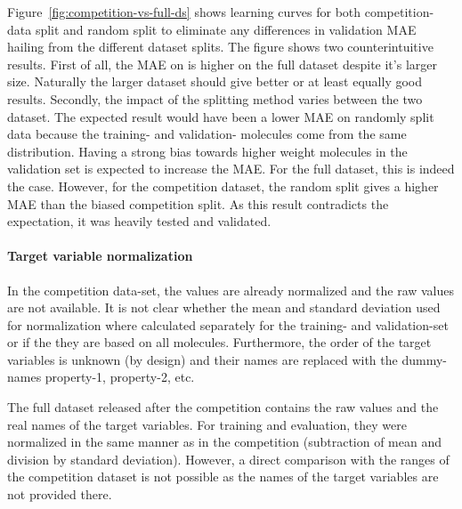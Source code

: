 Figure~\ref{fig:competition-vs-full-ds} shows learning curves for both competition-data split and random split to eliminate any differences in validation MAE hailing from the different dataset splits.
The figure shows two counterintuitive results. First of all, the MAE on is higher on the full dataset despite it's larger size. Naturally the larger dataset should give better or at least equally good results. Secondly, the impact of the splitting method varies between the two dataset. The expected result would have been a lower MAE on randomly split data because the training- and validation- molecules come from the same distribution. Having a strong bias towards higher weight molecules in the validation set is expected to increase the MAE. For the full dataset, this is indeed the case. However, for the competition dataset, the random split gives a higher MAE than the biased competition split. As this result contradicts the expectation, it was heavily tested and validated.



\paragraph{Target variable normalization}

In the competition data-set, the values are already normalized and the raw values are not available. It is not clear whether the mean and standard deviation used for normalization where calculated separately for the training- and validation-set or if the they are based on all molecules. Furthermore, the order of the target variables is unknown (by design) and their names are replaced with the dummy-names property-1, property-2, etc.

The full dataset released after the competition contains the raw values and the real names of the target variables. For training and evaluation, they were normalized in the same manner as in the competition (subtraction of mean and division by standard deviation). However, a direct comparison with the ranges of the competition dataset is not possible as the names of the target variables are not provided there. 

